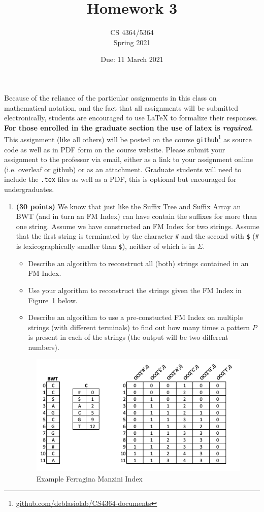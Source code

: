 \documentclass[11pt, oneside]{article}   	%
\title{Homework 3}
\author{CS 4364/5364\\Spring 2021}
\date{Due: 11 March 2021}							%
\begin{document}
\maketitle

Because of the reliance of the particular assignments in this class on mathematical notation, 
and the fact that all assignments will be submitted electronically, 
students are encouraged to use \LaTeX{} to formalize their responses. 
\textbf{For those enrolled in the graduate section the use of latex is \emph{required}.}
This assignment (like all others) will be posted on the course \texttt{github}\footnote{\url{github.com/deblasiolab/CS4364-documents}} as source code as well as in PDF form on the course website. 
Please submit your assignment to the professor via email, either as a link to your assignment online (i.e. overleaf or github) or as an attachment. 
Graduate students will need to include the \texttt{.tex} files as well as a PDF, this is optional but encouraged for undergraduates. 


\begin{enumerate}


\item \textbf{(30 points)} 
We know that just like the Suffix Tree and Suffix Array an BWT (and in turn an FM Index) can have contain the suffixes for more than one string. 
Assume we have constructed an FM Index for two strings. 
Assume that the first string is terminated by the character  \texttt{\#} and the second with \texttt{\$} (\texttt{\#} is lexicographically smaller than \texttt{\$}), neither of which is in $\Sigma$.
\begin{itemize}
\item Describe an algorithm to reconstruct all (both) strings contained in an FM Index. 
\item Use your algorithm to reconstruct the strings given the FM Index in Figure~\ref{fig:q1b} below. 
\item Describe an algorithm to use a pre-constucted FM Index on multiple strings (with different terminals) to find out how many times a pattern $P$ is present in each of the strings (the output will be two different numbers). 
\end{itemize}

\begin{figure}
\includegraphics{HW3_FIG}
\caption{Example Ferragina Manzini Index}
\label{fig:q1b}
\end{figure}
\end{enumerate}
\end{document}
